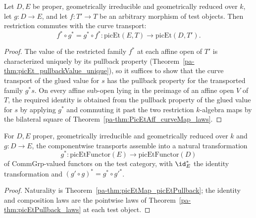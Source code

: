 \begin{theorem}
  \label{pa-thm:picEtMap_picEtPullback}
  \leanok

  Let \(D, E\) be proper, geometrically irreducible and geometrically reduced over
  \(k\), let \(g \colon D \to E\), and let \(f \colon T' \to T\) be an arbitrary
  morphism of test objects. Then restriction commutes with the curve transport:
  \[
    f^{*} \circ g^{*} = g^{*} \circ f^{*}
    \colon \mathrm{picEt}(E, T) \longrightarrow \mathrm{picEt}(D, T').
  \]
\end{theorem}
\begin{proof}
  \leanok
  The value of the restricted family \(f^{*}\) at each affine open of \(T'\) is
  characterized uniquely by its pullback property
  (Theorem~\ref{pa-thm:picEt_pullbackValue_unique}), so it suffices to show that the curve
  transport of the glued value for \(s\) has the pullback property for the transported
  family \(g^{*}s\). On every affine sub-open lying in the preimage of an affine open
  \(V\) of \(T\), the required identity is obtained from the pullback property of the
  glued value for \(s\) by applying \(g^{*}\) and commuting it past the two restriction
  \(k\)-algebra maps by the bilateral square of
  Theorem~\ref{pa-thm:PicEtAff_curveMap_laws}.
\end{proof}

\begin{definition}
  \label{pa-def:picEtPullbackNat}
  \leanok

  For \(D, E\) proper, geometrically irreducible and geometrically reduced over \(k\)
  and \(g \colon D \to E\), the componentwise transports assemble into a natural
  transformation
  \[
    g^{*} \colon \mathrm{picEtFunctor}(E) \longrightarrow \mathrm{picEtFunctor}(D)
  \]
  of \(\mathrm{CommGrp}\)-valued functors on the test category, with
  \(\id_E^{*}\) the identity transformation and
  \((g' \circ g)^{*} = g^{*} \circ g'^{*}\).
\end{definition}
\begin{proof}
  \leanok
  Naturality is Theorem~\ref{pa-thm:picEtMap_picEtPullback}; the identity and composition
  laws are the pointwise laws of Theorem~\ref{pa-thm:picEtPullback_laws} at each test
  object.
\end{proof}

